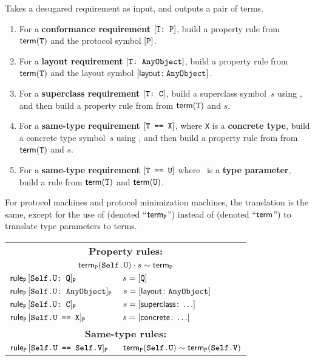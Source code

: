 \documentclass[../generics]{subfiles}
\begin{document}
\begin{algorithm}\label{build rule}
Takes a desugared requirement as input, and outputs a pair of terms.
\begin{enumerate}
\item For a \textbf{conformance requirement} $[\texttt{T:~P}]$, build a property rule from $\mathsf{term}(\texttt{T})$ and the protocol symbol $[\texttt{P}]$.
\item For a \textbf{layout requirement} $[\texttt{T:~AnyObject}]$, build a property rule from $\mathsf{term}(\texttt{T})$ and the layout symbol $[\mathsf{layout}\colon\texttt{AnyObject}]$.
\item For a \textbf{superclass requirement} $[\texttt{T:~C}]$, build a superclass symbol~$s$ using , and then build a property rule from from $\mathsf{term}(\texttt{T})$ and $s$.
\item For a \textbf{same-type requirement} $[\texttt{T == X}]$, where \texttt{X} is a \textbf{concrete type}, build a concrete type symbol~$s$ using , and then build a property rule from from $\mathsf{term}(\texttt{T})$ and $s$.
\item For a \textbf{same-type requirement} $[\texttt{T == U}]$ where \tU\ is a \textbf{type parameter}, build a rule from $\mathsf{term}(\texttt{T})$ and $\mathsf{term}(\texttt{U})$.
\end{enumerate}
\end{algorithm}

For protocol machines and protocol minimization machines, the translation is the same, except for the use of  (denoted ``$\mathsf{term}_{\texttt{P}}$'') instead of  (denoted ``$\mathsf{term}$'') to translate type parameters to terms.

\begin{center}
\begin{tabular}{ll}
\toprule
\multicolumn{2}{c}{\textbf{Property rules:}}\\
\multicolumn{2}{c}{$\mathsf{term}_{\texttt{P}}(\texttt{Self.U})\cdot s \sim \mathsf{term}_{\texttt{P}}$}\\
\midrule
$\mathsf{rule}_{\texttt{P}}\, [\texttt{Self.U:~Q}]_{\texttt{P}}$ & $s = [\texttt{Q}]$\\
$\mathsf{rule}_{\texttt{P}}\, [\texttt{Self.U:~AnyObject}]_{\texttt{P}}$ & $s = [\mathsf{layout}\colon\texttt{AnyObject}]$\\
$\mathsf{rule}_{\texttt{P}}\, [\texttt{Self.U:~C}]_{\texttt{P}}$ & $s = [\mathsf{superclass}\colon \ldots]$\\
$\mathsf{rule}_{\texttt{P}}\, [\texttt{Self.U == X}]_{\texttt{P}}$ & $s = [\mathsf{concrete}\colon \ldots]$\\
\midrule
\multicolumn{2}{c}{\textbf{Same-type rules:}}\\
$\mathsf{rule}_{\texttt{P}}\, [\texttt{Self.U == Self.V}]_{\texttt{P}}$ & $\mathsf{term}_{\texttt{P}}(\texttt{Self.U})\sim\mathsf{term}_{\texttt{P}}(\texttt{Self.V})$\\
\bottomrule
\end{tabular}
\end{center}
\end{document}
